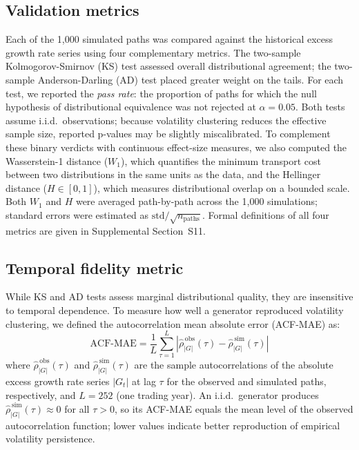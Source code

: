 \subsection*{Validation metrics}
Each of the 1,000 simulated paths was compared against the historical excess growth rate series using four complementary metrics. The two-sample Kolmogorov-Smirnov (KS) test \cite{kolmogorov_1933, smirnov_1948} assessed overall distributional agreement; the two-sample Anderson-Darling (AD) test \cite{anderson_darling_1952} placed greater weight on the tails. For each test, we reported the \textit{pass rate}: the proportion of paths for which the null hypothesis of distributional equivalence was not rejected at $\alpha = 0.05$. Both tests assume i.i.d.\ observations; because volatility clustering reduces the effective sample size, reported p-values may be slightly miscalibrated. To complement these binary verdicts with continuous effect-size measures, we also computed the Wasserstein-1 distance ($W_1$), which quantifies the minimum transport cost between two distributions in the same units as the data, and the Hellinger distance ($H \in [0,1]$), which measures distributional overlap on a bounded scale. Both $W_1$ and $H$ were averaged path-by-path across the 1,000 simulations; standard errors were estimated as $\mathrm{std}/\sqrt{n_{\mathrm{paths}}}$. Formal definitions of all four metrics are given in Supplemental Section~S11.

\subsection*{Temporal fidelity metric}
While KS and AD tests assess marginal distributional quality, they are insensitive to temporal dependence. To measure how well a generator reproduced volatility clustering, we defined the autocorrelation mean absolute error (ACF-MAE) as:
\begin{equation}
    \text{ACF-MAE} = \frac{1}{L}\sum_{\tau=1}^{L} \left\lvert \widehat{\rho}_{|G|}^{\,\text{obs}}(\tau) - \widehat{\rho}_{|G|}^{\,\text{sim}}(\tau) \right\rvert
    \label{eq:acf_mae}
\end{equation}
where $\widehat{\rho}_{|G|}^{\,\text{obs}}(\tau)$ and $\widehat{\rho}_{|G|}^{\,\text{sim}}(\tau)$ are the sample autocorrelations of the absolute excess growth rate series $|G_t|$ at lag $\tau$ for the observed and simulated paths, respectively, and $L=252$ (one trading year). An i.i.d.\ generator produces $\widehat{\rho}_{|G|}^{\,\text{sim}}(\tau)\approx 0$ for all $\tau>0$, so its ACF-MAE equals the mean level of the observed autocorrelation function; lower values indicate better reproduction of empirical volatility persistence.

